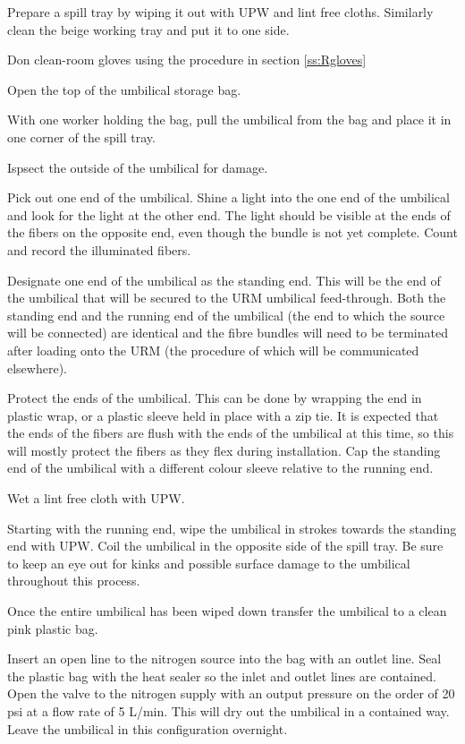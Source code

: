 \documentclass[11pt]{article}
\begin{document}
\begin{answerlist}
\item Prepare a spill tray by wiping it out with UPW and lint free
  cloths. Similarly clean the beige working tray and put it to one
  side.
\item Don clean-room gloves using the procedure in section \ref{ss:Rgloves}
\item Open the top of the umbilical storage bag. 
\item With one worker holding the bag, pull the umbilical from the bag
  and place it in one corner of the spill tray.
\item Ispsect the outside of the umbilical for damage.
\item Pick out one end of the umbilical. Shine a light into the one
  end of the umbilical and look for the light at the other end. The
  light should be visible at the ends of the fibers on the opposite
  end, even though the bundle is not yet complete. Count and record
  the illuminated fibers.
\item Designate one end of the umbilical as the standing end. This
  will be the end of the umbilical that will be secured to the URM
  umbilical feed-through. Both the standing end and the running end of
  the umbilical (the end to which the source will be connected) are
  identical and the fibre bundles will need to be terminated after
  loading onto the URM (the procedure of which will be communicated
  elsewhere).
\item Protect the ends of the umbilical. This can be done by wrapping
  the end in plastic wrap, or a plastic sleeve held in place with a
  zip tie. It is expected that the ends of the fibers are flush with
  the ends of the umbilical at this time, so this will mostly
  protect the fibers as they flex during installation. Cap the standing
  end of the umbilical with a different colour sleeve relative to the
  running end.
\item Wet a lint free cloth with UPW.
\item Starting with the running end, wipe the umbilical in strokes
  towards the standing end with UPW. Coil the umbilical in the
  opposite side of the spill tray. Be sure to keep an eye out for
  kinks and possible surface damage to the umbilical throughout this
  process.
\item Once the entire umbilical has been wiped down transfer the umbilical to a clean pink plastic bag.
\item Insert an open line to the nitrogen source into the bag with an outlet line. Seal the plastic bag with the heat sealer so the inlet and outlet lines are contained. Open the valve to the nitrogen supply with an output pressure on the order of 20 psi at a flow rate of 5 L/min. This will dry out the umbilical in a contained way. Leave the umbilical in this configuration overnight.

\end{answerlist}
\end{document}
